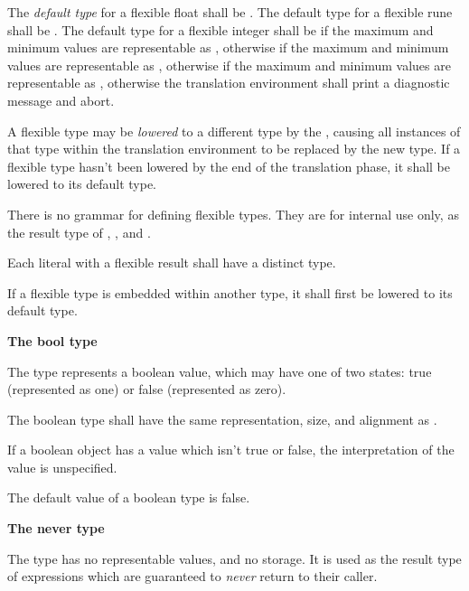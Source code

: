 \specsubsubitem
The \textit{default type} for a flexible float shall be . The
default type for a flexible rune shall be . The default type for
a flexible integer shall be  if the maximum and minimum values are
representable as , otherwise  if the maximum and
minimum values are representable as , otherwise  if
the maximum and minimum values are representable as , otherwise
the translation environment shall print a diagnostic message and abort.

\specsubsubitem
A flexible type may be \textit{lowered} to a different type by the
, causing all instances of that
type within the translation environment to be replaced by the new type. If a
flexible type hasn't been lowered by the end of the translation phase, it shall
be lowered to its default type.

\specsubsubitem
There is no grammar for defining flexible types. They are for internal use only,
as the result type of ,
, and .

\specsubsubitem
Each literal with a flexible result shall have a distinct type.

\specsubsubitem
If a flexible type is embedded within another type, it shall first be lowered to
its default type.



\textbf{The bool type}

\specsubsubitem
The  type represents a boolean value, which may have one of two
states: true (represented as one) or false (represented as zero).

\specsubsubitem
The boolean type shall have the same representation, size, and alignment as
.

\specsubsubitem
If a boolean object has a value which isn't true or false, the interpretation of
the value is unspecified.

\specsubsubitem
The default value of a boolean type is false.

\textbf{The never type}

\specsubsubitem
The  type has no representable values, and no storage. It is
used as the result type of expressions which are guaranteed to \textit{never}
return to their caller.

